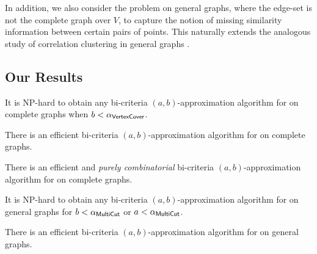 In addition, we also consider the \robcc problem on general graphs, where the edge-set is not the complete graph over $V$, to capture the notion of missing similarity information between certain pairs of points. This naturally extends the analogous study of correlation clustering in general graphs \cite{XXX}.

\subsection{Our Results}
\begin{theorem} \label{thm:complete-hardness}
It is NP-hard to obtain any bi-criteria $(a,b)$-approximation algorithm for \robcc on complete graphs when $b < \alpha_{\sf VertexCover}$.
\end{theorem}


\begin{theorem} \label{thm:complete1}
There is an efficient bi-criteria $(a,b)$-approximation algorithm for \robcc on complete graphs.
\end{theorem}

\begin{theorem} \label{thm:complete2}
There is an efficient and \emph{purely combinatorial} bi-criteria $(a,b)$-approximation algorithm for \robcc on complete graphs.
\end{theorem}

\begin{theorem} \label{thm:general-hardness}
It is NP-hard to obtain any bi-criteria $(a,b)$-approximation algorithm for \robcc on general graphs for $b < \alpha_{\sf MultiCut}$ or $a < \alpha_{\sf MultiCut}$.
\end{theorem}

\begin{theorem} \label{thm:general}
There is an efficient bi-criteria $(a,b)$-approximation algorithm for \robcc on general graphs.
\end{theorem}
